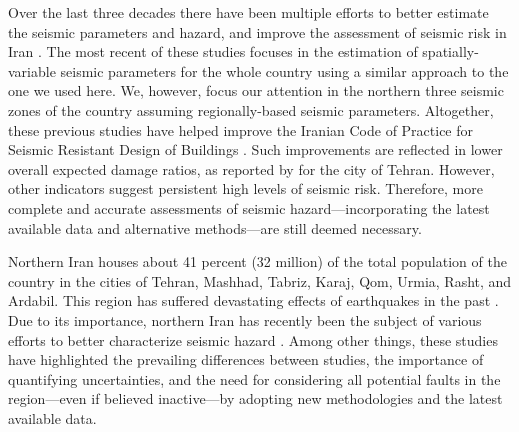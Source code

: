 Over the last three decades there have been multiple efforts to better estimate the seismic parameters and hazard, and improve the assessment of seismic risk in Iran \citep[e.g.,][]{Tavakoli1999, Moinfar_2000_Chap, Ghodrati2003, Moinfar_2012_WCEE, Khodaverdian_2016_BSSA}. The most recent of these studies \citep{Khodaverdian_2016_BSSA} focuses in the estimation of spatially-variable seismic parameters for the whole country using a similar approach to the one we used here. We, however, focus our attention in the northern three seismic zones of the country assuming regionally-based seismic parameters. Altogether, these previous studies have helped improve the Iranian Code of Practice for Seismic Resistant Design of Buildings \citep{BHRC2014}. Such improvements are reflected in lower overall expected damage ratios, as reported by \citet{Ghodrati2013} for the city of Tehran. However, other indicators suggest persistent high levels of seismic risk. Therefore, more complete and accurate assessments of seismic hazard---incorporating the latest available data and alternative methods---are still deemed necessary.

Northern Iran houses about 41 percent (32 million) of the total population of the country in the cities of Tehran, Mashhad, Tabriz, Karaj, Qom, Urmia, Rasht, and Ardabil. This region has suffered devastating effects of earthquakes in the past \citep[e.g.,][]{Mehrain_1990_Tech, Chafory-Ashtiany_1999_DPM, Razzaghi_2012_Tech}. Due to its importance, northern Iran has recently been the subject of various efforts to better characterize seismic hazard \citep[e.g.,][]{Abdollahzadeh2014a, Boostan2015}. Among other things, these studies have highlighted the prevailing differences between studies, the importance of quantifying uncertainties, and the need for considering all potential faults in the region---even if believed inactive---by adopting new methodologies and the latest available data.

